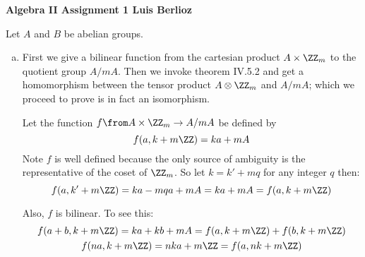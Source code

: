 \textbf{Algebra II Assignment 1 \hspace{\fill} Luis Berlioz}
\begin{description} \itemindent-9pt 
\item[IV.5.2] Let $A$ and $B$ be abelian groups.
\begin{enumerate}[(a)]
\item First we give a bilinear function from the cartesian product $A\times \ZZ_m$ to the quotient group $A/mA$. Then we invoke theorem IV.5.2 and get a homomorphism between the tensor product $A\otimes \ZZ_m$ and $A/mA$; which we proceed to prove is in fact an isomorphism.

    Let the function $f\from A\times \ZZ_m\to A/mA$ be defined by $$f(a,k+m\ZZ) = ka+mA$$
    Note $f$ is well defined because the only source of ambiguity is the representative of the coset of $\ZZ_m$. So let $k=k'+mq$ for any integer $q$ then:
    $$f(a,k' + m\ZZ) = ka - mqa+mA=ka+mA = f(a,k+m\ZZ)$$

    Also, $f$ is bilinear. To see this:
    \begin{gather*}
        f(a+b,k+m\ZZ)=ka + kb +mA =f(a,k+m\ZZ)+f(b,k+m\ZZ)\\
        f(na,k+m\ZZ) = nka+m\ZZ = f(a,nk+m\ZZ)
    \end{gather*}


\end{enumerate}
\end{description}

